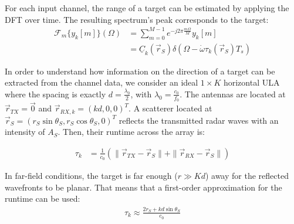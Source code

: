 For each input channel, the range of a target can be estimated by applying the DFT over time.
The resulting spectrum's peak corresponds to the target:
\begin{align}
    \mathcal{F}_m\{y_k[m]\}(\Omega) & = \sum_{m=0}^{M-1} e^{-j2\pi\frac{m\Omega}{M}} y_k[m]                                      \\
                                    & = \underline C_k(\vec r_S) \delta(\Omega-\dot \omega \tau_k(\vec r_S)T_s) \label{eq:y_fft}
\end{align}


In order to understand how information on the direction of a target can be extracted from the channel data,
we consider an ideal $1 \times K$ horizontal ULA
where the spacing is exactly $d=\frac{\lambda_0}{2}$, with $\lambda_0 = \frac{c_0}{f_0}$.
The antennas are located at $\vec r_{TX}= \vec 0$ and $\vec r_{RX,k}=(kd,0,0)^T$.
A scatterer located at  $\vec r_S = (r_S\sin\theta_S, r_{S}\cos\theta_S , 0)^T$
reflects the transmitted radar waves with an intensity of $A_S$.
Then, their runtime across the array is:

\begin{align}
    \tau_k & =\frac{1}{c_0} \left( \| \vec r_{TX} - \vec r_S \|+\| \vec r_{RX} - \vec r_S \| \right)
\end{align}

In far-field conditions, the target is far enough ($r \gg K d$) away for the reflected wavefronts to be planar.
That means that a first-order approximation for the runtime can be used:
\begin{align}
    \tau_k \approx \frac{2r_S + kd\sin\theta_S}{c_0}
\end{align}

